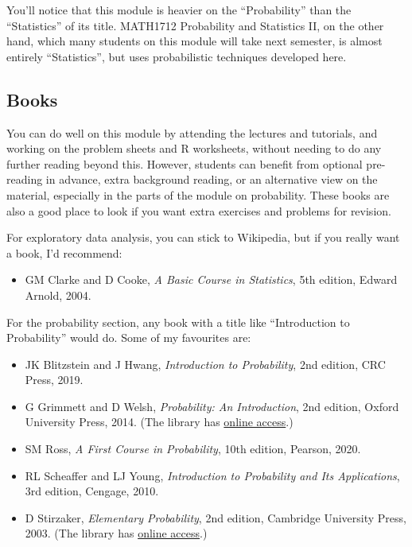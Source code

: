 \documentclass[
  a4paper,
]{book}
\providecommand{\tightlist}{%
  \setlength{\itemsep}{0pt}\setlength{\parskip}{0pt}}
\theoremstyle{definition}
\theoremstyle{definition}
\theoremstyle{definition}
\theoremstyle{definition}
\theoremstyle{remark}
\begin{document}
You'll notice that this module is heavier on the ``Probability'' than the ``Statistics'' of its title. MATH1712 Probability and Statistics II, on the other hand, which many students on this module will take next semester, is almost entirely ``Statistics'', but uses probabilistic techniques developed here.

\hypertarget{books}{%
\subsection*{Books}\label{books}}

You can do well on this module by attending the lectures and tutorials, and working on the problem sheets and R worksheets, without needing to do any further reading beyond this. However, students can benefit from optional pre-reading in advance, extra background reading, or an alternative view on the material, especially in the parts of the module on probability. These books are also a good place to look if you want extra exercises and problems for revision.

For exploratory data analysis, you can stick to Wikipedia, but if you really want a book, I'd recommend:

\begin{itemize}
\tightlist
\item
  GM Clarke and D Cooke, \emph{A Basic Course in Statistics}, 5th edition, Edward Arnold, 2004.
\end{itemize}

For the probability section, any book with a title like ``Introduction to Probability'' would do. Some of my favourites are:

\begin{itemize}
\tightlist
\item
  JK Blitzstein and J Hwang, \emph{Introduction to Probability}, 2nd edition, CRC Press, 2019.
\item
  G Grimmett and D Welsh, \emph{Probability: An Introduction}, 2nd edition, Oxford University Press, 2014. (The library has \href{https://leeds.primo.exlibrisgroup.com/permalink/44LEE_INST/13rlbcs/alma991002938669705181}{online access}.)
\item
  SM Ross, \emph{A First Course in Probability}, 10th edition, Pearson, 2020.
\item
  RL Scheaffer and LJ Young, \emph{Introduction to Probability and Its Applications}, 3rd edition, Cengage, 2010.
\item
  D Stirzaker, \emph{Elementary Probability}, 2nd edition, Cambridge University Press, 2003. (The library has \href{https://leeds.primo.exlibrisgroup.com/permalink/44LEE_INST/13rlbcs/alma991013131349705181}{online access}.)
\end{itemize}
\end{document}
